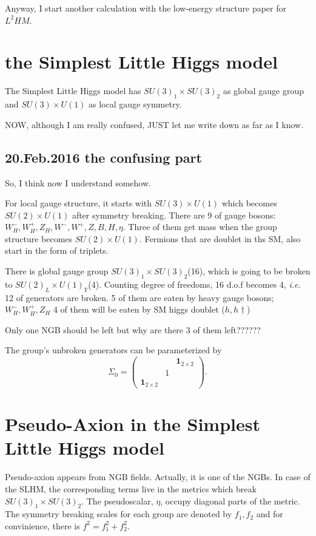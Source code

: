 \documentclass[aps,preprint,floatfix,nofootinbib,showpacs]{revtex4-1}
\begin{document}
Anyway, I start another calculation with the low-energy structure paper for $L^2 HM$. 




\newpage
\section{the Simplest Little Higgs model}
The Simplest Little Higgs model has $SU(3)_1\times SU(3)_2$ as global gauge group and 
$SU(3)\times U(1)$ as local gauge symmetry.

NOW, although I am really confused, JUST let me write down as far as I know.

\subsection{20.Feb.2016 the confusing part }
So, I think now I understand somehow.

For local gauge structure, it starts with $SU(3)\times U(1)$ 
which becomes $SU(2)\times U(1)$ after symmetry breaking.
There are 9 of gauge bosons: $W^-_H, W^+_H, Z_H, W^-, W^+, Z, B, H, \eta$.
Three of them get mass when the group structure becomes $SU(2)\times U(1)$. 
Fermions that are doublet in ths SM, also start in the form of triplets. 

There is global gauge group $SU(3)_1\times SU(3)_2$(16), which is going to be broken
to $SU(2)_L \times U(1)_Y$(4). Counting degree of freedoms, 16 d.o.f becomes 4, {\it i.e.}
12 of generators are broken. 5 of them are eaten by heavy gauge bosons; $W^-_H, W^+_H, Z_H$
4 of them will be eaten by SM higgs doublet ($h, h\dagger $)

{\large{Only one NGB should be left but why are there 3 of them left??????}}



The group's unbroken generators can be 
parameterized by 
\begin{equation}
\label{Sigma0}
\Sigma_0 = \left( \begin{array}{ccc}
 & & {\mathbf{1}}_{2 \times 2} \\
 &1 & \\
{\mathbf{1}}_{2 \times 2} & &
\end{array}\right).
\end{equation}



\newpage
\section{Pseudo-Axion in the Simplest Little Higgs model}
Pseudo-axion appears from NGB fields. Actually, it is one of the NGBs. 
In case of the SLHM, the corresponding terms live in the metrics 
which break $SU(3)_1\times SU(3)_2$. 
The pseudoscalar, $\eta$, occupy diagonal parts of the metric. 
The symmetry breaking scales for each group are denoted by $f_1, f_2$ and
for convinience, there is $f^2 = f_1^2+f_2^2$. 
\end{document}
